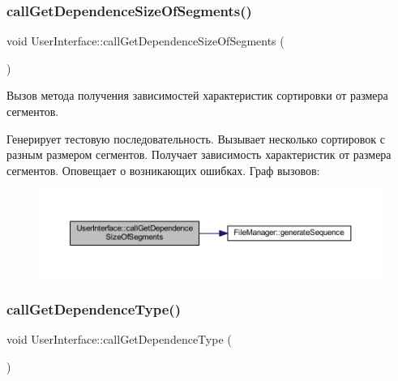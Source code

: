 \subsubsection{\texorpdfstring{call\+Get\+Dependence\+Size\+Of\+Segments()}{callGetDependenceSizeOfSegments()}}
{\footnotesize\ttfamily void User\+Interface\+::call\+Get\+Dependence\+Size\+Of\+Segments (\begin{DoxyParamCaption}{ }\end{DoxyParamCaption})\hspace{0.3cm}{\ttfamily [private]}}



Вызов метода получения зависимостей характеристик сортировки от размера сегментов. 

Генерирует тестовую последовательность. Вызывает несколько сортировок с разным размером сегментов. Получает зависимость характеристик от размера сегментов. Оповещает о возникающих ошибках. Граф вызовов\+:\nopagebreak
\begin{figure}[H]
\begin{center}
\leavevmode
\includegraphics[width=350pt]{class_user_interface_ab668f3b2d9f89ce3eacda5e166f33807_cgraph}
\end{center}
\end{figure}
\hypertarget{class_user_interface_aa413c00a65ae4faf9421e9fc359663ec}{}\label{class_user_interface_aa413c00a65ae4faf9421e9fc359663ec} 
\subsubsection{\texorpdfstring{call\+Get\+Dependence\+Type()}{callGetDependenceType()}}
{\footnotesize\ttfamily void User\+Interface\+::call\+Get\+Dependence\+Type (\begin{DoxyParamCaption}{ }\end{DoxyParamCaption})\hspace{0.3cm}{\ttfamily [private]}}



